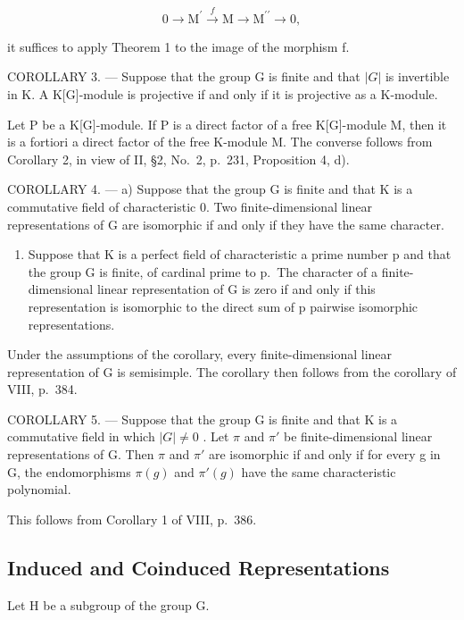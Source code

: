 \[
0 \longrightarrow \mathrm{M} ^ {\prime} \stackrel {f} {\longrightarrow} \mathrm{M} \longrightarrow \mathrm{M} ^ {\prime \prime} \longrightarrow 0,
\]

it suffices to apply Theorem 1 to the image of the morphism f.

COROLLARY 3. --- Suppose that the group G is finite and that \(|G|\) is invertible in K. A K{[}G{]}-module is projective if and only if it is projective as a K-module.

Let P be a K{[}G{]}-module. If P is a direct factor of a free K{[}G{]}-module M, then it is a fortiori a direct factor of the free K-module M. The converse follows from Corollary 2, in view of II, §2, No.~2, p.~231, Proposition 4, d).

COROLLARY 4. --- a) Suppose that the group G is finite and that K is a commutative field of characteristic 0. Two finite-dimensional linear representations of G are isomorphic if and only if they have the same character.

\begin{enumerate}
\def\labelenumi{\alph{enumi})}
\setcounter{enumi}{1}
\tightlist
\item
  Suppose that K is a perfect field of characteristic a prime number p and that the group G is finite, of cardinal prime to p.~The character of a finite-dimensional linear representation of G is zero if and only if this representation is isomorphic to the direct sum of p pairwise isomorphic representations.
\end{enumerate}

Under the assumptions of the corollary, every finite-dimensional linear representation of G is semisimple. The corollary then follows from the corollary of VIII, p.~384.

COROLLARY 5. --- Suppose that the group G is finite and that K is a commutative field in which \(|G| \neq 0\) . Let \(\pi\) and \(\pi'\) be finite-dimensional linear representations of G. Then \(\pi\) and \(\pi'\) are isomorphic if and only if for every g in G, the endomorphisms \(\pi(g)\) and \(\pi'(g)\) have the same characteristic polynomial.

This follows from Corollary 1 of VIII, p.~386.

\subsection{Induced and Coinduced Representations}

Let H be a subgroup of the group G.

